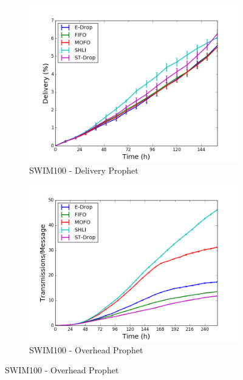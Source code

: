 \begin{figure}
    \begin{subfigure}[b]{0.5\columnwidth}
        \includegraphics[width=\linewidth]{imgs/swim/100/Prophet-delivery.png}
        \caption{SWIM100 - Delivery Prophet}
        \label{fig:swim100ProphetDel}
    \end{subfigure}
    \begin{subfigure}[b]{0.5\columnwidth}
        \includegraphics[width=\linewidth]{imgs/swim/100/Prophet-overhead.png}
        \caption{SWIM100 - Overhead Prophet}
        \label{fig:swim100ProphetOver}
    \end{subfigure}


\end{figure}

